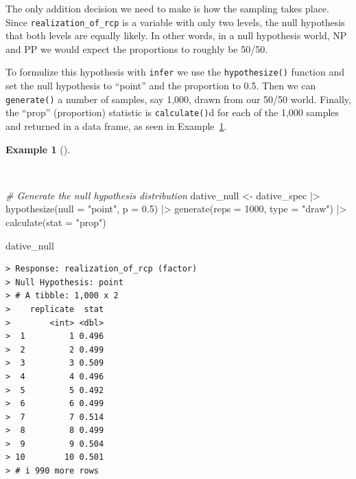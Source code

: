\documentclass[
  letterpaper,
  DIV=11,
  numbers=noendperiod]{scrreprt}
\newenvironment{Shaded}{\begin{snugshade}}{\end{snugshade}}
\newcommand{\AttributeTok}[1]{\textcolor[rgb]{0.00,0.00,0.00}{#1}}
\newcommand{\CommentTok}[1]{\textcolor[rgb]{0.00,0.00,0.00}{\textit{#1}}}
\newcommand{\DecValTok}[1]{\textcolor[rgb]{0.00,0.00,0.00}{#1}}
\newcommand{\FloatTok}[1]{\textcolor[rgb]{0.00,0.00,0.00}{#1}}
\newcommand{\FunctionTok}[1]{\textcolor[rgb]{0.00,0.00,0.00}{#1}}
\newcommand{\NormalTok}[1]{\textcolor[rgb]{0.00,0.00,0.00}{#1}}
\newcommand{\OtherTok}[1]{\textcolor[rgb]{0.00,0.00,0.00}{#1}}
\newcommand{\SpecialCharTok}[1]{\textcolor[rgb]{0.00,0.00,0.00}{#1}}
\newcommand{\StringTok}[1]{\textcolor[rgb]{0.00,0.00,0.00}{#1}}
\theoremstyle{definition}
\newtheorem{example}{Example}[chapter]
\theoremstyle{remark}
\begin{document}
The only addition decision we need to make is how the sampling takes
place. Since \texttt{realization\_of\_rcp} is a variable with only two
levels, the null hypothesis that both levels are equally likely. In
other words, in a null hypothesis world, NP and PP we would expect the
proportions to roughly be 50/50.

To formulize this hypothesis with \texttt{infer} we use the
\texttt{hypothesize()} function and set the null hypothesis to ``point''
and the proportion to 0.5. Then we can \texttt{generate()} a number of
samples, say 1,000, drawn from our 50/50 world. Finally, the ``prop''
(proportion) statistic is \texttt{calculate()}d for each of the 1,000
samples and returned in a data frame, as seen in
Example~\ref{exm-ida-cat-null-hypothesis}.

\begin{example}[]\protect\hypertarget{exm-ida-cat-null-hypothesis}{}\label{exm-ida-cat-null-hypothesis}

~

\begin{Shaded}
\begin{Highlighting}[]
\CommentTok{\# Generate the null hypothesis distribution}
\NormalTok{dative\_null }\OtherTok{\textless{}{-}}
\NormalTok{  dative\_spec }\SpecialCharTok{|\textgreater{}}
  \FunctionTok{hypothesize}\NormalTok{(}\AttributeTok{null =} \StringTok{"point"}\NormalTok{, }\AttributeTok{p =} \FloatTok{0.5}\NormalTok{) }\SpecialCharTok{|\textgreater{}}
  \FunctionTok{generate}\NormalTok{(}\AttributeTok{reps =} \DecValTok{1000}\NormalTok{, }\AttributeTok{type =} \StringTok{"draw"}\NormalTok{) }\SpecialCharTok{|\textgreater{}}
  \FunctionTok{calculate}\NormalTok{(}\AttributeTok{stat =} \StringTok{"prop"}\NormalTok{)}

\NormalTok{dative\_null}
\end{Highlighting}
\end{Shaded}

\begin{verbatim}
> Response: realization_of_rcp (factor)
> Null Hypothesis: point
> # A tibble: 1,000 x 2
>    replicate  stat
>        <int> <dbl>
>  1         1 0.496
>  2         2 0.499
>  3         3 0.509
>  4         4 0.496
>  5         5 0.492
>  6         6 0.499
>  7         7 0.514
>  8         8 0.499
>  9         9 0.504
> 10        10 0.501
> # i 990 more rows
\end{verbatim}

\end{example}
\end{document}
